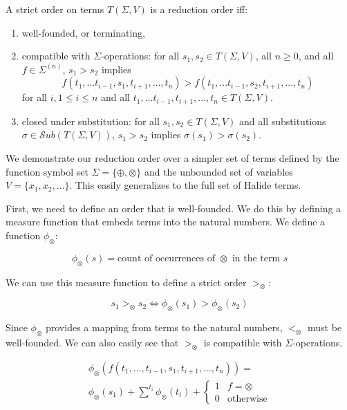 \documentclass[sigplan,review,anonymous]{acmart}\settopmatter{printfolios=true,printccs=false,printacmref=false}
\begin{document}
\begin{definition}
A strict order on terms $T(\Sigma, V)$ is a reduction order iff: 
\begin{enumerate}
    \item well-founded, or terminating,
    \item compatible with $\Sigma$-operations: for all $s_1, s_2 \in T(\Sigma,V)$, all $n \geq 0$, and all $f \in \Sigma^{(n)}$, $s_1 > s_2$ implies
    \[ f(t_1,...t_{i-1},s_1,t_{i+1},...,t_n) > f(t_1,...t_{i-1},s_2,t_{i+1},...,t_n)
    \]
    for all $i, 1 \leq i \leq n$ and all $t_1,...t_{i-1},t_{i+1},...,t_n \in T(\Sigma,V)$.
    \item closed under substitution: for all $s_1, s_2 \in T(\Sigma,V)$ and all substitutions $\sigma \in \mathcal{S}ub(T(\Sigma,V))$, $s_1 > s_2$ implies $\sigma(s_1) > \sigma(s_2)$.
\end{enumerate}
\end{definition}

We demonstrate our reduction order over a simpler set of terms defined by the function symbol set $\Sigma = \{\oplus, \otimes\}$ and the unbounded set of variables $V = \{x_1, x_2, \ldots \}$. This easily generalizes to the full set of Halide terms.

First, we need to define an order that is well-founded. We do this by defining a measure function that embeds terms into the natural numbers. We define a function $\phi_\otimes$:

\[
\phi_\otimes(s) = \textrm{count of occurrences of } \otimes \textrm{ in the term } s
\]

We can use this measure function to define a strict order $>_\otimes$:

\[
s_1 >_\otimes s_2 \iff \phi_\otimes(s_1) > \phi_\otimes(s_2)
\]

Since $\phi_\otimes$ provides a mapping from terms to the natural numbers, $<_\otimes$ must be well-founded. We can also easily see that $>_\otimes$ is compatible with $\Sigma$-operations.

\[
\begin{aligned}
\phi_\otimes(f(t_1, \ldots, t_{i-1}, s_1, t_{i+1}, \ldots, t_n)) = \\
\phi_\otimes(s_1) + \sum^{t_i} \phi_\otimes(t_i) + \begin{cases} 1 & f = \otimes \\
0 & \textrm{otherwise} \end{cases}
\end{aligned}
\]
\end{document}
